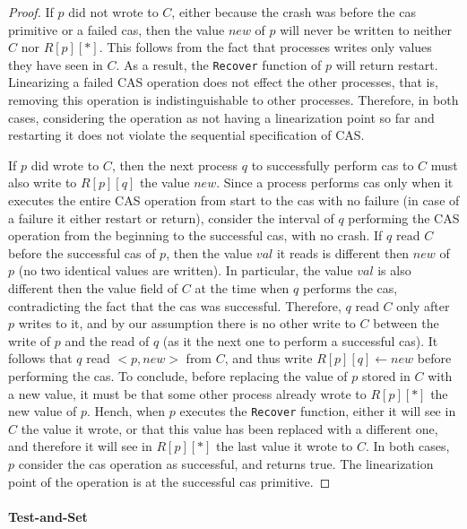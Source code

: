 \begin{proof}
	If $p$ did not wrote to $C$, either because the crash was before the cas primitive or a failed cas, then the value $new$ of $p$ will never be written to neither $C$ nor $R[p][*]$. This follows from the fact that processes writes only values they have seen in $C$. As a result, the \texttt{Recover} function of $p$ will return restart. Linearizing a failed CAS operation does not effect the other processes, that is, removing this operation is indistinguishable to other processes. Therefore, in both cases, considering the operation as not having a linearization point so far and restarting it does not violate the sequential specification of CAS.
	
	If $p$ did wrote to $C$, then the next process $q$ to successfully perform cas to $C$ must also write to $R[p][q]$ the value $new$. Since a process performs cas only when it executes the entire CAS operation from start to the cas with no failure (in case of a failure it either restart or return), consider the interval of $q$ performing the CAS operation from the beginning to the successful cas, with no crash. If $q$ read $C$ before the successful cas of $p$, then the value $val$ it reads is different then $new$ of $p$ (no two identical values are written). In particular, the value $val$ is also different then the value field of $C$ at the time when $q$ performs the cas, contradicting the fact that the cas was successful. Therefore, $q$ read $C$ only after $p$ writes to it, and by our assumption there is no other write to $C$ between the write of $p$ and the read of $q$ (as it the next one to perform a successful cas). It follows that $q$ read $<p,new>$ from $C$, and thus write $R[p][q] \gets new$ before performing the cas.
	To conclude, before replacing the value of $p$ stored in $C$ with a new value, it must be that some other process already wrote to $R[p][*]$ the new value of $p$. Hench, when $p$ executes the \texttt{Recover} function, either it will see in $C$ the value it wrote, or that this value has been replaced with a different one, and therefore it will see in $R[p][*]$ the last value it wrote to $C$. In both cases, $p$ consider the cas operation as successful, and returns true. The linearization point of the operation is at the successful cas primitive.
	 
\end{proof}

\paragraph*{Test-and-Set}

